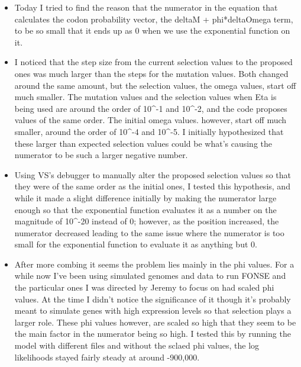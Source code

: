 \documentclass[11pt]{labbook}
\begin{document}
    \begin{itemize}
        \item Today I tried to find the reason that the numerator in the equation that calculates the codon probability vector, the deltaM + phi*deltaOmega term, to be so small that it ends up as 0 when we use the exponential function on it.
        \item I noticed that the step size from the current selection values to the proposed ones was much larger than the steps for the mutation values. Both changed around the same amount, but the selection values, the omega values, start off much smaller. The mutation values and the selection values when Eta is being used are around the order of 10^-1 and 10^-2, and the code proposes values of the same order. The initial omega values. however, start off much smaller, around the order of 10^-4 and 10^-5. I initially hypothesized that these larger than expected selection values could be what's causing the numerator to be such a larger negative number.
        \item Using VS's debugger to manually alter the proposed selection values so that they were of the same order as the initial ones, I tested this hypothesis, and while it made a slight difference initially by making the numerator large enough so that the exponential function evaluates it as a number on the magnitude of 10^-20 instead of 0; however, as the position increased, the numerator decreased leading to the same issue where the numerator is too small for the exponential function to evaluate it as anything but 0.
        \item After more combing it seems the problem lies mainly in the phi values. For a while now I've been using simulated genomes and data to run FONSE and the particular ones I was directed by Jeremy to focus on had scaled phi values. At the time I didn't notice the significance of it though it's probably meant to simulate genes with high expression levels so that selection plays a larger role. These phi values however, are scaled so high that they seem to be the main factor in the numerator being so high. I tested this by running the model with different files and without the sclaed phi values, the log likelihoods stayed fairly steady at around -900,000.
    \end{itemize}
    
\end{document}
